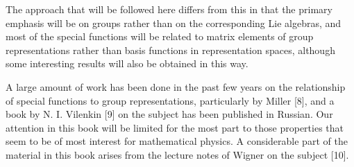 The approach that will be followed here differs from this in that the primary emphasis will be on groups rather than on the corresponding Lie algebras, and most of the special functions will be related to matrix elements of group representations rather than basis functions in representation spaces, although some interesting results will also be obtained in this way.

A large amount of work has been done in the past few years on the relationship of special functions to group representations, particularly by Miller [8], and a book by N. I. Vilenkin [9] on the subject has been published in Russian. Our attention in this book will be limited for the most part to those properties that seem to be of most interest for mathematical physics. A considerable part of the material
in this book arises from the lecture notes of Wigner on the subject [10].

\endinput